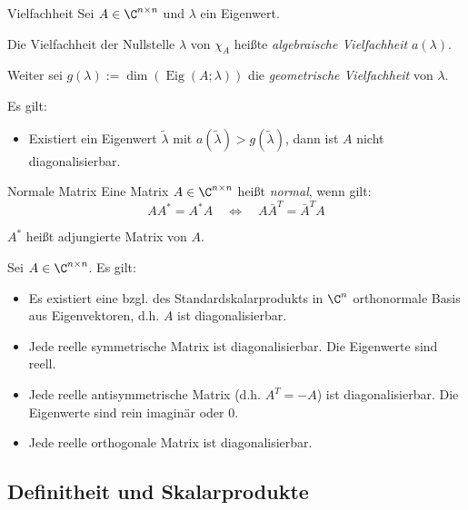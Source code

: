 \documentclass[german]{../spicker}
\newcommand{\Eig}{\operatorname{Eig}}
\begin{document}
\begin{defi}{Vielfachheit}
    Sei $A \in \C^{n\times n}$ und $\lambda$ ein Eigenwert.

    Die Vielfachheit der Nullstelle $\lambda$ von $\chi_A$ heißte \emph{algebraische Vielfachheit} $a(\lambda)$.

    Weiter sei $g(\lambda) := \dim(\Eig(A;\lambda))$ die \emph{geometrische Vielfachheit} von $\lambda$.

    Es gilt:
    \begin{itemize}
        \item Existiert ein Eigenwert $\tilde{\lambda}$ mit $a(\tilde{\lambda}) > g(\tilde{\lambda})$, dann ist $A$ nicht diagonalisierbar.
    \end{itemize}
\end{defi}

\begin{bonus}{Normale Matrix}
    Eine Matrix $A \in \C^{n\times n}$ heißt \emph{normal}, wenn gilt:
    $$
        AA^{*} = A^{*}A \quad \iff \quad A\bar{A}^T = \bar{A}^TA
    $$

    $A^{*}$ heißt adjungierte Matrix von $A$.

    Sei $A \in \C^{n\times n}$.
    Es gilt:
    \begin{itemize}
        \item Es existiert eine bzgl. des Standardskalarprodukts in $\C^n$ orthonormale Basis aus Eigenvektoren, d.h. $A$ ist diagonalisierbar.
        \item Jede reelle symmetrische Matrix ist diagonalisierbar. Die Eigenwerte sind reell.
        \item Jede reelle antisymmetrische Matrix (d.h. $A^T = -A$) ist diagonalisierbar. Die Eigenwerte sind rein imaginär oder 0.
        \item Jede reelle orthogonale Matrix ist diagonalisierbar.
    \end{itemize}
\end{bonus}

\subsection{Definitheit und Skalarprodukte}
\end{document}
